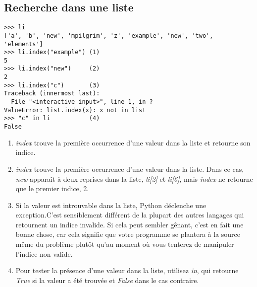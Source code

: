 \subsection{Recherche dans une liste}

\begin{example}
\begin{lstlisting}
>>> li
['a', 'b', 'new', 'mpilgrim', 'z', 'example', 'new', 'two', 'elements']
>>> li.index("example") (1)
5
>>> li.index("new")     (2)
2
>>> li.index("c")       (3)
Traceback (innermost last):
  File "<interactive input>", line 1, in ?
ValueError: list.index(x): x not in list
>>> "c" in li           (4)
False
\end{lstlisting}
\end{example}

\begin{enumerate}
\item{\emph{index} trouve la première occurrence d'une valeur dans la liste et retourne son indice.}
\item{\emph{index} trouve la première occurrence d'une valeur dans la liste. Dans ce cas, \emph{new} apparaît à deux reprises dans la liste, \emph{li[2]} et \emph{li[6]}, mais \emph{index} ne retourne que le premier indice, 2.}
\item{Si la valeur est introuvable dans la liste, Python déclenche une exception.C'est sensiblement différent de la plupart des autres langages qui retournent un indice invalide. Si cela peut sembler gênant, c'est en fait une bonne chose, car cela signifie que votre programme se plantera à la source même du problème plutôt qu'au moment où vous tenterez de manipuler l'indice non valide.}
\item{Pour tester la présence d'une valeur dans la liste, utilisez \emph{in}, qui retourne \emph{True} si la valeur a été trouvée et \emph{False} dans le cas contraire.}
\end{enumerate}


